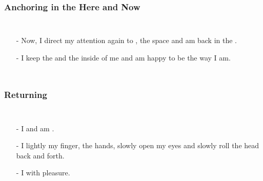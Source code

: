 \begin{frame}
\frametitle{Anchoring in the Here and Now}
\begin{columns}[c] %

\begin{itemize}
\item[-] Now, I direct my attention again to , the space and am back in the .
  \item[-] I keep the  and the  inside of me and am happy to be the way I am.
\end{itemize}
\end{columns}
\end{frame}

\begin{frame}
\frametitle{Returning}
\begin{columns}[c] %

\begin{itemize}
\item[-] I  and am .
\item[-] I lightly  my finger, the hands, slowly open my eyes and slowly roll the head back and forth.
  \item[-] I  with pleasure.
  \end{itemize}
\end{columns}
\end{frame}
